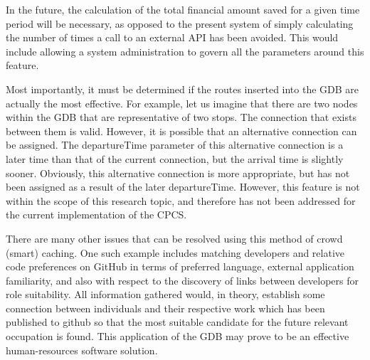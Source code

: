 \documentclass[12pt]{article}   	%
\begin{document}
In the future, the calculation of the total financial amount saved for a given time period will be necessary, as opposed to the present system of simply calculating the number of times a call to an external API has been avoided. This would include allowing a system administration to govern all the parameters around this feature.

Most importantly, it must be determined if the routes inserted into the GDB are actually the most effective. For example, let us imagine that there are two nodes within the GDB that are representative of two stops. The connection that exists between them is valid. However, it is possible that an alternative connection can be assigned. The departureTime parameter of this alternative connection is a later time than that of the current connection, but the arrival time is slightly sooner. Obviously, this alternative connection is more appropriate, but has not been assigned as a result of the later departureTime. However, this feature is not within the scope of this research topic, and therefore has not been addressed for the current implementation of the CPCS.

There are many other issues that can be resolved using this method of crowd (smart) caching. One such example includes matching developers and relative code preferences on GitHub in terms of preferred language, external application familiarity, and also with respect to the discovery of links between developers for role suitability. All information gathered would, in theory, establish some connection between individuals and their respective work which has been published to github so that the most suitable candidate for the future relevant occupation is found. This application of the GDB may prove to be an effective human-resources software solution.

\newpage
\end{document}
